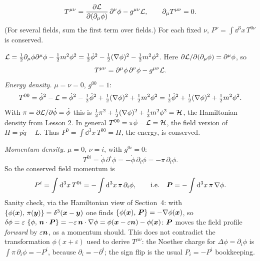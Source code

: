 \documentclass[11pt]{article}
\newcommand{\eps}{\varepsilon}
\begin{document}
\begin{keyresult}
\begin{equation}
  T^{\mu\nu}=\frac{\partial \mathcal{L}}{\partial (\partial_\mu\phi)}\,\partial^\nu\phi-g^{\mu\nu}\mathcal{L},\qquad \partial_\mu T^{\mu\nu}=0 .
\end{equation}
(For several fields, sum the first term over fields.) For each fixed $\nu$, $P^\nu=\int\dd^3x\,T^{0\nu}$ is conserved.
\end{keyresult}

\begin{example}
$\mathcal{L}=\tfrac12\partial_\mu\phi\partial^\mu\phi-\tfrac12m^2\phi^2=\tfrac12\dot\phi^2-\tfrac12(\nabla\phi)^2-\tfrac12m^2\phi^2$. Here $\partial\mathcal{L}/\partial(\partial_\mu\phi)=\partial^\mu\phi$, so
\begin{equation}
  T^{\mu\nu}=\partial^\mu\phi\,\partial^\nu\phi-g^{\mu\nu}\mathcal{L} .
\end{equation}
\emph{Energy density.} $\mu=\nu=0$, $g^{00}=1$:
\begin{equation}
  T^{00}=\dot\phi^2-\mathcal{L}=\dot\phi^2-\tfrac12\dot\phi^2+\tfrac12(\nabla\phi)^2+\tfrac12m^2\phi^2=\tfrac12\dot\phi^2+\tfrac12(\nabla\phi)^2+\tfrac12m^2\phi^2 .
\end{equation}
With $\pi=\partial\mathcal{L}/\partial\dot\phi=\dot\phi$ this is $\tfrac12\pi^2+\tfrac12(\nabla\phi)^2+\tfrac12m^2\phi^2=\mathcal{H}$, the Hamiltonian density from Lesson 2. In general $T^{00}=\pi\dot\phi-\mathcal{L}=\mathcal{H}$, the field version of $H=p\dot q-L$. Thus $P^0=\int\dd^3x\,T^{00}=H$, the energy, is conserved.

\emph{Momentum density.} $\mu=0$, $\nu=i$, with $g^{0i}=0$:
\begin{equation}
  T^{0i}=\dot\phi\,\partial^i\phi=-\dot\phi\,\partial_i\phi=-\pi\,\partial_i\phi .
\end{equation}
So the conserved field momentum is
\begin{equation}
  P^i=\int\mathrm{d}^3x\,T^{0i}=-\int\mathrm{d}^3x\,\pi\,\partial_i\phi,\qquad\text{i.e.}\quad \bm{P}=-\int\mathrm{d}^3x\,\pi\,\nabla\phi .
\end{equation}
Sanity check, via the Hamiltonian view of Section~4: with $\left\{\phi(\bm{x}),\,\pi(\bm{y})\right\}=\delta^3(\bm{x}-\bm{y})$ one finds $\left\{\phi(\bm{x}),\,\bm{P}\right\}=-\nabla\phi(\bm{x})$, so $\delta\phi=\eps\,\pb{\phi}{\vect n\cdot\vect P}=-\eps\,\vect n\cdot\nabla\phi=\phi(\vect x-\eps\vect n)-\phi(\vect x)$: $\bm{P}$ moves the field profile \emph{forward} by $\eps\vect n$, as a momentum should. This does not contradict the transformation $\phi(x+\eps)$ used to derive $T^{\mu\nu}$: the Noether charge for $\Delta\phi=\partial_i\phi$ is $\int\pi\,\partial_i\phi=-P^i$, because $\partial_i=-\partial^i$; the sign flip is the usual $P_i=-P^i$ bookkeeping.
\end{example}
\end{document}
